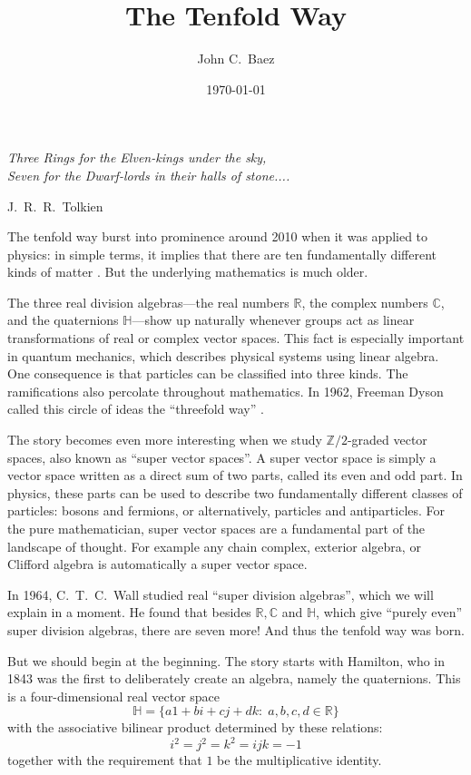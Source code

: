 \documentclass[]{amsart}
\newcommand{\Z}{{\mathbb Z}}  %
\newcommand{\R}{{\mathbb R}}  %
\newcommand{\C}{{\mathbb C}}  %
\renewcommand{\H}{{\mathbb H}}  %
\theoremstyle{definition}
\begin{document}
\title{The Tenfold Way}
\author[Baez]{John C.\ Baez} 
\address{Department of Mathematics, University of California, Riverside CA, 92521, USA}
\address{Centre for Quantum Technologies, National University of Singapore, 117543, Singapore}
\date{\today}
\maketitle


\epigraph{
\emph{Three Rings for the Elven-kings under the sky, \\
Seven for the Dwarf-lords in their halls of stone....}}
{J.\ R.\ R.\ Tolkien}

The tenfold way burst into prominence around 2010 when it was applied to physics: 
in simple terms, it implies that there are ten fundamentally different kinds of matter \cite{RSFL}.  But the underlying mathematics is much older.   

The three real division algebras---the real numbers $\R$, the complex numbers $\C$, and the quaternions $\H$---show up naturally whenever groups
act as linear transformations of real or complex vector spaces.   This fact is especially important in quantum mechanics, which describes physical systems using linear algebra.  One consequence is that particles can be classified into three kinds.  The ramifications also percolate throughout mathematics.   In 1962, Freeman Dyson called this circle of ideas the ``threefold way'' \cite{Dyson}.

The story becomes even more interesting when we study $\Z/2$-graded vector spaces, also known as ``super vector spaces''.  A super vector space is simply a vector space written as a direct sum of two parts, called its even and odd part.  In physics, these parts can be used to describe two fundamentally different classes of particles: bosons and fermions, or alternatively, particles and antiparticles.  For the pure mathematician, super vector spaces are a fundamental part of the landscape of thought.  For example any chain complex, exterior algebra, or Clifford algebra is automatically a super vector space. 

In 1964, C.\ T.\ C.\ Wall \cite{Wall} studied real ``super division algebras'', which we will explain in a moment.  He found that besides $\R, \C$ and $\H$, which give ``purely even'' super division algebras, there are seven more!   And thus the tenfold way was born.

But we should begin at the beginning.  The story starts with Hamilton, who in 1843 was the first to deliberately create an algebra, namely the quaternions.    This is a four-dimensional real vector space
\[    \H = \{a1 + bi + cj + dk : \; a,b,c,d \in \R \} \]
with the associative bilinear product determined by these relations:
\[     i^2 = j^2 = k^2 = ijk = -1 \]
together with the requirement that $1$ be the multiplicative identity.
\end{document}
